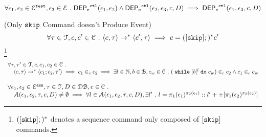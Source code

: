 \begin{lem}
\label{lem:ctl_trans}
\[
  \forall \mathtt{\epsilon}_1, \mathtt{\epsilon}_2 \in \mathcal{E}^{\mathtt{{test}}}, \mathtt{\epsilon}_3 \in \mathcal{E} ~.~
  \mathsf{DEP_{\mathtt{e}}}^{\mathtt{{ctl}}}(\mathtt{\epsilon}_1, \mathtt{\epsilon}_2) 
  \land \mathsf{DEP_{\mathtt{e}}}^{\mathtt{{ctl}}}(\mathtt{\epsilon}_2, \mathtt{\epsilon}_3, c, D)
  \implies \mathsf{DEP_{\mathtt{e}}}^{\mathtt{{ctl}}}(\mathtt{\epsilon}_1, \mathtt{\epsilon}_3, c, D)
\]
\end{lem}
%
\begin{lem}
\label{lem:inv_skip}
(Only $\mathtt{skip}$ Command doesn't Produce Event)
\\
\[
	\forall \mathtt{\tau}\in \mathcal{T}, c, c' \in \mathcal{C} ~.~
	\langle c, \mathtt{\tau} \rangle \rightarrow^* \langle c', \mathtt{\tau} \rangle
	\implies 
	c = ([\mathtt{skip}];)^*c'
\]
\footnote{$([\mathtt{skip}];){}^*$ denotes a sequence command only composed of $[\mathtt{skip}]$ commands.}
\end{lem}
%
\begin{lem}
\label{lem:inv_while}
\[
\begin{array}{l}
\forall \mathtt{\tau}, \mathtt{\tau}' \in \mathcal{T}, c, c_1, c_2 \in \mathcal{C} ~.~
	\\ \quad
	\langle c, \mathtt{\tau} \rangle \rightarrow^* \langle c_1; c_2, \mathtt{\tau}' \rangle
	\implies
	c_1 \in_c c_2
	\implies
	\exists l \in \mathbb{N}, b \in \mathcal{B}, c_w \in \mathcal{C} ~.~ 
	(\;\mathtt{while}\; [b]^l \;\mathtt{do}\; c_w) \in_c c_2 \land c_1 \in_c c_w
\end{array}
\]
\end{lem}
%
\begin{lem}
\label{lem:inv_alg1}
\[
\begin{array}{l}
  \forall \mathtt{\epsilon}_1, \mathtt{\epsilon}_2 \in \mathcal{E}^{\mathtt{{asn}}}, \mathtt{\tau} \in \mathcal{T}, D \in \mathcal{DB} , c \in \mathcal{C} ~.~
  \\ \quad 
  \mathcal{A}(\mathtt{\epsilon}_1, \mathtt{\epsilon}_2, \mathtt{\tau}, c, D) \neq \emptyset
  \implies
  \forall l \in \mathcal{A}(\mathtt{\epsilon}_1, \mathtt{\epsilon}_2, \mathtt{\tau}, c, D), \exists l' ~.~ l = \pi_1(\mathtt{\epsilon}_1)^{\pi_2(\mathtt{\epsilon}_1)} :: l' ++ [\pi_1(\mathtt{\epsilon}_2)^{\pi_2(\mathtt{\epsilon}_2)}]
\end{array}
\]
\end{lem}
%
